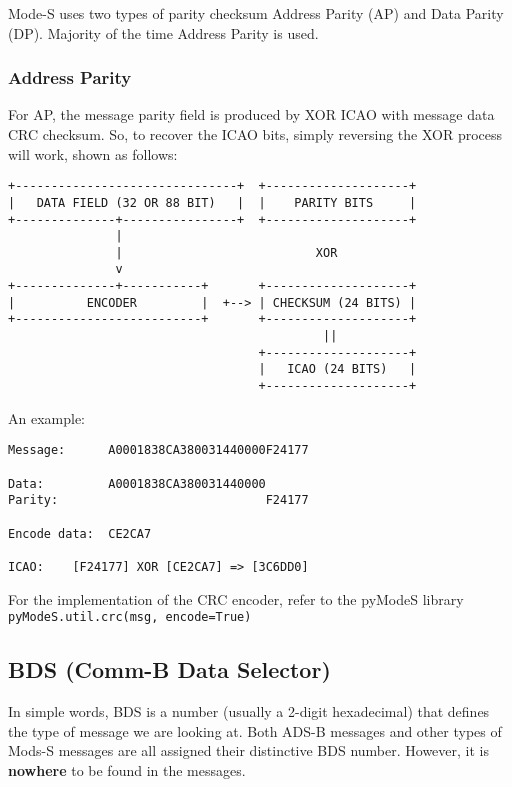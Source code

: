 Mode-S uses two types of parity checksum Address Parity (AP) and Data
Parity (DP). Majority of the time Address Parity is used.

\subsubsection{Address Parity}\label{address-parity}

For AP, the message parity field is produced by XOR ICAO with message
data CRC checksum. So, to recover the ICAO bits, simply reversing the
XOR process will work, shown as follows:

\begin{verbatim}
+-------------------------------+  +--------------------+
|   DATA FIELD (32 OR 88 BIT)   |  |    PARITY BITS     |
+--------------+----------------+  +--------------------+
               |
               |                           XOR
               v
+--------------+-----------+       +--------------------+
|          ENCODER         |  +--> | CHECKSUM (24 BITS) |
+--------------------------+       +--------------------+
                                            ||
                                   +--------------------+
                                   |   ICAO (24 BITS)   |
                                   +--------------------+
\end{verbatim}

An example:

\begin{verbatim}
Message:      A0001838CA380031440000F24177

Data:         A0001838CA380031440000
Parity:                             F24177

Encode data:  CE2CA7

ICAO:    [F24177] XOR [CE2CA7] => [3C6DD0]
\end{verbatim}

For the implementation of the CRC encoder, refer to the pyModeS library
\texttt{pyModeS.util.crc(msg,\ encode=True)}

\subsection{BDS (Comm-B Data Selector)}\label{bds-comm-b-data-selector}

In simple words, BDS is a number (usually a 2-digit hexadecimal) that
defines the type of message we are looking at. Both ADS-B messages and
other types of Mods-S messages are all assigned their distinctive BDS
number. However, it is \textbf{nowhere} to be found in the messages.

